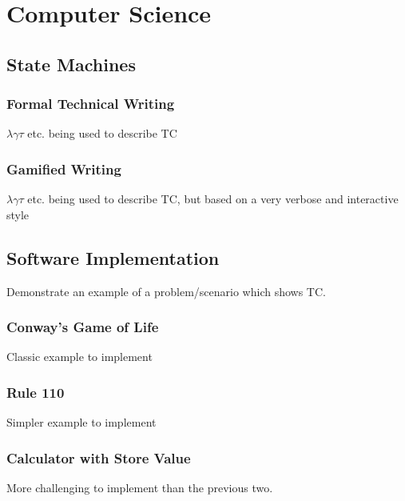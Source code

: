 \section{Computer Science}\label{sec:CompSci}

\subsection{State Machines}\label{subsec:StateMachines}

\subsubsection{Formal Technical Writing}\label{subsubsec:FormalWriting}

$\lambda \gamma \tau $ etc. being used to describe TC

\subsubsection{Gamified Writing}\label{subsubsec:GamifiedWriting}

$\lambda \gamma \tau $ etc. being used to describe TC, but based on a very verbose and interactive style

\subsection{Software Implementation}\label{subsec:SoftwareImplementation}

Demonstrate an example of a problem/scenario which shows TC.

\subsubsection{Conway's Game of Life}\label{subsubsec:CGoL}

Classic example to implement

\subsubsection{Rule 110}\label{subsubsec:Rule110}

Simpler example to implement

\subsubsection{Calculator with Store Value}\label{subsubsec:CalculatorStore}

More challenging to implement than the previous two.

